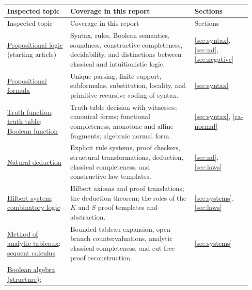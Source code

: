 \begingroup\small
\begin{longtable}{@{}>{\raggedright\arraybackslash}p{}>{\raggedright\arraybackslash}p{}>{\raggedright\arraybackslash}p{}@{}}
\toprule
Inspected topic & Coverage in this report & Sections\\
\midrule
\endfirsthead
\toprule
Inspected topic & Coverage in this report & Sections\\
\midrule
\endhead
\bottomrule
\endfoot
\href{https://en.wikipedia.org/wiki/Propositional_logic}{Propositional logic}
  (starting article) &
Syntax, rules, Boolean semantics, soundness, constructive completeness,
decidability, and distinctions between classical and intuitionistic logic.
& \ref{sec:syntax}, \ref{sec:nd}, \ref{sec:negative}\\[5pt]
\href{https://en.wikipedia.org/wiki/Propositional_formula}{Propositional formula}
& Unique parsing, finite support, subformulas, substitution, locality, and
primitive recursive coding of syntax.
& \ref{sec:syntax}\\[5pt]
\href{https://en.wikipedia.org/wiki/Truth_function}{Truth function};
\href{https://en.wikipedia.org/wiki/Truth_table}{truth table};
\href{https://en.wikipedia.org/wiki/Boolean_function}{Boolean function}
& Truth-table decision with witnesses; canonical forms; functional
completeness; monotone and affine fragments; algebraic normal form.
& \ref{sec:syntax}, \ref{ca-normal}\\[5pt]
\href{https://en.wikipedia.org/wiki/Natural_deduction}{Natural deduction}
& Explicit rule systems, proof checkers, structural transformations,
deduction, classical completeness, and constructive law templates.
& \ref{sec:nd}, \ref{sec:laws}\\[5pt]
\href{https://en.wikipedia.org/wiki/Hilbert_system}{Hilbert system};
\href{https://en.wikipedia.org/wiki/Combinatory_logic}{combinatory logic}
& Hilbert axioms and proof translations; the deduction theorem;
the roles of the $K$ and $S$ proof templates and abstraction.
& \ref{sec:systems}, \ref{sec:laws}\\[5pt]
\href{https://en.wikipedia.org/wiki/Method_of_analytic_tableaux}{Method of
analytic tableaux};
\href{https://en.wikipedia.org/wiki/Sequent_calculus}{sequent calculus}
& Bounded tableau expansion, open-branch countervaluations, analytic
classical completeness, and cut-free proof reconstruction.
& \ref{sec:systems}\\[5pt]
\href{https://en.wikipedia.org/wiki/Boolean_algebra_(structure)}{Boolean
algebra (structure)};

\end{longtable}

